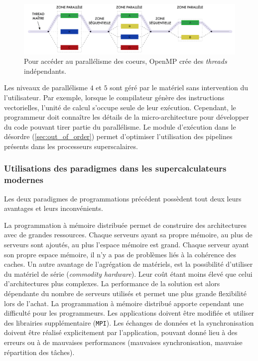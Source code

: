             \begin{figure}
            \center
            \includegraphics[width=14cm]{images/openmp.png}
            \caption{\label{fig:openmp} Pour accéder au parallélisme des coeurs, OpenMP crée des \textit{threads} indépendants\protect\footnotemark.}
            \end{figure}
            
            Les niveaux de parallélisme $4$ et $5$ sont géré par le matériel sans intervention du l'utilisateur. Par exemple, lorsque le compilateur génère des instructions vectorielles, l'unité de calcul s'occupe seule de leur exécution. Cependant, le programmeur doit connaître les détails de la micro-architecture pour développer du code pouvant tirer partie du parallélisme. Le module d'exécution dans le désordre (\autoref{sec:out_of_order}) permet d'optimiser l'utilisation des pipelines présents dans les processeurs superscalaires.
        
        \subsubsection{Utilisations des paradigmes dans les supercalculateurs modernes}
        
            Les deux paradigmes de programmations précédent possèdent tout deux leurs avantages et leurs inconvénients.
            
            La programmation à mémoire distribuée permet de construire des architectures avec de grandes ressources. Chaque serveurs ayant sa propre mémoire, au plus de serveurs sont ajoutés, au plus l'espace mémoire est grand. Chaque serveur ayant son propre espace mémoire, il n'y a pas de problèmes liés à la cohérence des caches. Un autre avantage de l'agrégation de matériels, est la possibilité d'utiliser du matériel de série (\textit{commodity hardware}). Leur coût étant moins élevé que celui d'architectures plus complexes. La performance de la solution est alors dépendante du nombre de serveurs utilisés et permet une plus grande flexibilité lors de l'achat. La programmation à mémoire distribué apporte cependant une difficulté pour les programmeurs. Les applications doivent être modifiée et utiliser des librairies supplémentaire (\verb|MPI|). Les échanges de données et la synchronisation doivent être réalisé explicitement par l'application, pouvant donné lieu à des erreurs ou à de mauvaises performances (mauvaises synchronisation, mauvaise répartition des tâches).
            
